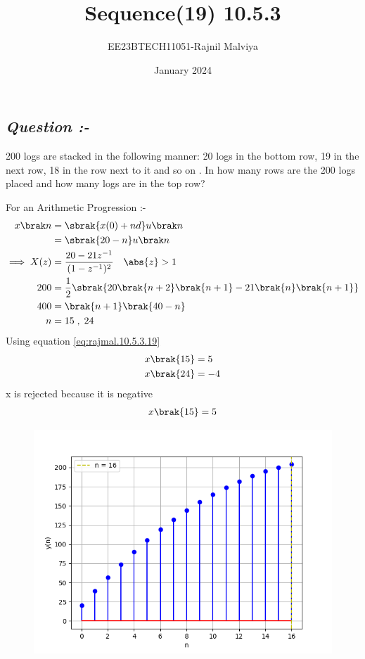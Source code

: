 \documentclass[journal,12pt,twocolumn]{IEEEtran}
\theoremstyle{remark}
\begin{document}
\title{Sequence(19) 10.5.3}
\author{EE23BTECH11051-Rajnil Malviya}
\date{January 2024}
\maketitle
\subsection*{\textit{Question :-}}
200 logs are stacked in the following manner: 20 logs in the bottom row, 19 in the next row,
18 in the row next to it and so on . In how many rows are the 200 logs placed
and how many logs are in the top row?

\begin{table}[h!]
            
    \end{table}
     For an Arithmetic Progression :-
\begin{align}x\brak n&=\sbrak {x(0)+n d} u \brak n \\
&=\sbrak{20-n} u \brak n \label{eq:rajmal.10.5.3.19}\\
 \implies X(z)&=\frac{20-21z^{-1}}{(1 - z^{-1})^2}  \quad \abs{ z} > 1 \\
  200 &=\frac{1}{2}\sbrak{20\brak{n+2}\brak{n+1}-21\brak{n}\brak{n+1}}\\
  400&=\brak{n+1} \brak{40-n} \\
   n & =15\; ,\;24 
 \end{align}
Using equation \eqref{eq:rajmal.10.5.3.19}
\begin{align} &x\brak{15}=5 \\
 &x\brak{24}=-4  \end{align}
x is rejected because it is negative
\begin{align}x\brak{15}=5\end{align}
\begin{figure}
   \includegraphics[width=1\linewidth]{figs/f2.png}
\end{figure}
\end{document}
